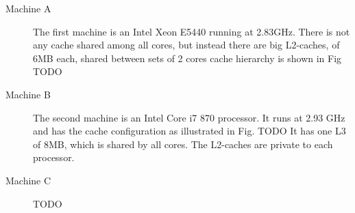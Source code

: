 \begin{figure}[htbp]
 \centering%
  \qquad\qquad
 \caption{}
\end{figure}

\begin{description}
\item[Machine A] The first machine is an Intel Xeon E5440 running at 2.83GHz. There is not any cache shared among all cores, but instead 
there are big L2-caches, of 6MB each, shared between sets of 2 cores cache hierarchy is shown in Fig TODO

\item[Machine B] The second machine is an Intel Core i7 870 processor. It runs at 2.93 GHz and has the cache configuration as illustrated in Fig. TODO
It has one L3 of 8MB, which is shared by all cores. The L2-caches are private to each processor. 

\item[Machine C] TODO

\end{description}

